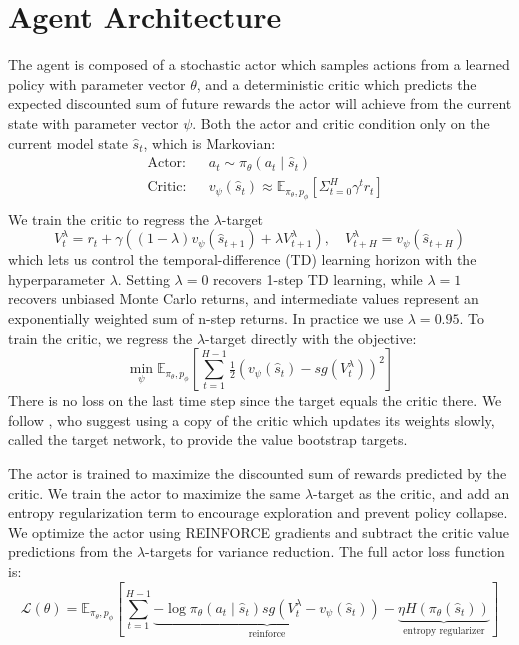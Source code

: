 \documentclass[10pt]{article} %
\theoremstyle{plain}
\theoremstyle{definition}
\theoremstyle{remark}
\begin{document}
\section{Agent Architecture}

The agent is composed of a stochastic actor which samples actions from a learned policy with parameter vector $\theta$, and a deterministic critic which predicts the expected discounted sum of future rewards the actor will achieve from the current state with parameter vector $\psi$. Both the actor and critic condition only on the current model state $\hat{s}_t$, which is Markovian:
\begin{equation}
\begin{aligned}
    &\text{Actor:} &&a_t \sim \pi_\theta(a_t \mid \hat{s}_t)\\
    &\text{Critic:} &&v_\psi(\hat{s}_t) \approx \mathbb{E}_{\pi_\theta, p_\phi}[\Sigma_{t=0}^H \gamma^t r_t] \\
\end{aligned}
\end{equation}
We train the critic to regress the $\lambda$-target \citep{suttonbarto}
\begin{equation}\label{lambdareturn}
   V^{\lambda}_t = r_t + \gamma \left( (1-\lambda)v_\psi(\hat{s}_{t+1}) + \lambda V^\lambda_{t+1}\right), \quad V^\lambda_{t+H} = v_\psi(\hat{s}_{t+H}) 
\end{equation}
which lets us control the temporal-difference (TD) learning horizon with the hyperparameter $\lambda$. Setting $\lambda = 0$ recovers 1-step TD learning, while $\lambda = 1$ recovers unbiased Monte Carlo returns, and intermediate values represent an exponentially weighted sum of n-step returns. In practice we use $\lambda = 0.95$. To train the critic, we regress the $\lambda$-target directly with the objective:
\begin{equation}\label{critictarget}
    \min_\psi \mathbb{E}_{\pi_\theta, p_\phi}\left[ \sum_{t=1}^{H-1}\tfrac{1}{2} ( v_\psi(\hat{s}_t) - sg(V^\lambda_t))^2\right]
\end{equation}
There is no loss on the last time step since the target equals the critic there. We follow \citet{mnih2015}, who suggest using a copy of the critic which updates its weights slowly, called the target network, to provide the value bootstrap targets. %

The actor is trained to maximize the discounted sum of rewards predicted by the critic. We train the actor to maximize the same $\lambda$-target as the critic, and add an entropy regularization term to encourage exploration and prevent policy collapse. We optimize the actor using REINFORCE gradients \citep{reinforce} and subtract the critic value predictions from the $\lambda$-targets for variance reduction. The full actor loss function is:
\begin{equation}\label{actorloss}
    \mathcal{L}(\theta) = \mathbb{E}_{\pi_\theta, p_\phi}\left[ 
    \sum_{t=1}^{H-1} \underbrace{- \log \pi_\theta(a_t \mid \hat{s}_t) sg(V^\lambda_t - v_\psi(\hat{s}_t))}_{\text{reinforce}} - \underbrace{\eta H(\pi_\theta(\hat{s}_t))}_{\text{entropy regularizer}}
    \right]
\end{equation}
\end{document}
